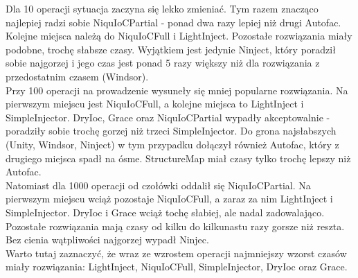 \documentclass[12pt]{article}
\begin{document}
Dla 10 operacji sytuacja zaczyna się lekko zmieniać. Tym razem znacząco najlepiej radzi sobie NiquIoCPartial - ponad dwa razy lepiej niż drugi Autofac. Kolejne miejsca należą do NiquIoCFull i LightInject. Pozostałe rozwiązania miały podobne, trochę słabsze czasy. Wyjątkiem jest jedynie Ninject, który poradził sobie najgorzej i jego czas jest ponad 5 razy większy niż dla rozwiązania z przedostatnim czasem (Windsor).\\
Przy 100 operacji na prowadzenie wysuneły się mniej popularne rozwiązania. Na pierwszym miejscu jest NiquIoCFull, a kolejne miejsca to LightInject i SimpleInjector. DryIoc, Grace oraz NiquIoCPartial wypadły akceptowalnie - poradziły sobie trochę gorzej niż trzeci SimpleInjector. Do grona najsłabszych (Unity, Windsor, Ninject) w tym przypadku dołączył również Autofac, który z drugiego miejsca spadł na ósme. StructureMap miał czasy tylko trochę lepszy niż Autofac.\\
Natomiast dla 1000 operacji od czołówki oddalił się NiquIoCPartial. Na pierwszym miejscu wciąż pozostaje NiquIoCFull, a zaraz za nim LightInject i SimpleInjector. DryIoc i Grace wciąż tochę słabiej, ale nadal zadowalająco. Pozostałe rozwiązania mają czasy od kilku do kilkunastu razy gorsze niż reszta. Bez cienia wątpliwości najgorzej wypadł Ninjec.\\
Warto tutaj zaznaczyć, że wraz ze wzrostem operacji najmniejszy wzorst czasów miały rozwiązania: LightInject, NiquIoCFull, SimpleInjector, DryIoc oraz Grace.
\end{document}
